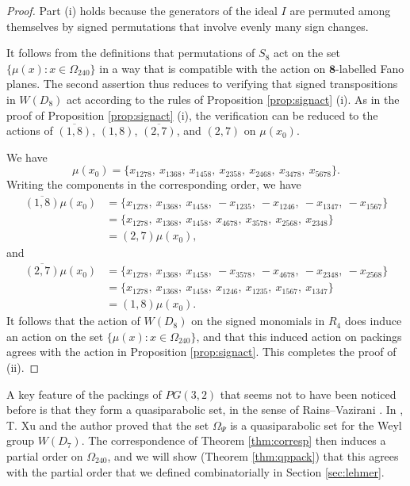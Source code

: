 \documentclass{amsart}
\theoremstyle{plain}
\theoremstyle{definition}
\theoremstyle{remark}
\numberwithin{equation}{section}
\newcommand{\eight}{{\mathbf 8}}
\newcommand{\qpx}{\Omega_{240}}
\newcommand{\qp}{\Omega}
\begin{document}
\begin{proof}
Part (i) holds because the generators of the ideal $I$ are permuted among themselves by signed 
permutations that involve evenly many sign changes.

It follows from the definitions that permutations of $S_8$ act on the set $\{\mu(x) : x \in \qpx\}$ in a 
way that is compatible with the action on $\eight$-labelled Fano planes. The second assertion thus reduces
to verifying that signed transpositions in $W(D_8)$ act according to the rules of Proposition \ref{prop:signact} (i). 
As in the proof of Proposition \ref{prop:signact} (i), the verification can be reduced to the actions of 
$\overline{(1, 8)}$, $(1, 8)$, $\overline{(2, 7)}$, and $(2, 7)$ on $\mu(x_0)$.

We have $$
\mu(x_0) = \{
x_{1278}, \ x_{1368}, \ x_{1458}, \ x_{2358}, \ x_{2468}, \ x_{3478}, \ x_{5678}
\}
.$$ Writing the components in the corresponding order, we have \begin{align*}
\overline{(1, 8)} \mu(x_0) &= \{
x_{1278}, \ x_{1368}, \ x_{1458}, \ -x_{1235}, \ -x_{1246}, \ -x_{1347}, \ -x_{1567} 
\}\\ 
&= \{
x_{1278}, \ x_{1368}, \ x_{1458}, \ x_{4678}, \ x_{3578}, \ x_{2568}, \ x_{2348} 
\} \\
&= (2, 7) \mu(x_0)
,\end{align*} and \begin{align*}
\overline{(2, 7)} \mu(x_0) &= \{
x_{1278}, \ x_{1368}, \ x_{1458}, \ -x_{3578}, \ -x_{4678}, \ -x_{2348}, \ -x_{2568} 
\}\\ 
&= \{
x_{1278}, \ x_{1368}, \ x_{1458}, \ x_{1246}, \ x_{1235}, \ x_{1567}, \ x_{1347} 
\} \\
&= (1, 8) \mu(x_0)
.\end{align*} It follows that the action of $W(D_8)$ on the signed monomials in $R_4$ does induce an action
on the set $\{\mu(x) : x \in \qpx\}$, and that this induced action on packings agrees with the action in
Proposition \ref{prop:signact}. This completes the proof of (ii).
\end{proof}

A key feature of the packings of $PG(3, 2)$ that seems not to have been noticed before is that they form a quasiparabolic
set, in the sense of Rains--Vazirani \cite{rains13}. In \cite[\S6.3]{gx5}, T. Xu and the author proved that the set
$\qp_\Psi$ is a quasiparabolic set for the Weyl group $W(D_7)$. The correspondence of Theorem \ref{thm:corresp} then induces
a partial order on $\qpx$, and we will show (Theorem \ref{thm:qppack}) that this agrees with the partial order that we 
defined combinatorially in Section \ref{sec:lehmer}.
\end{document}
